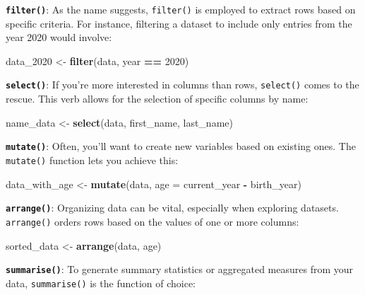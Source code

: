 \documentclass[
  b5paper]{book}
\newenvironment{Shaded}{\begin{snugshade}}{\end{snugshade}}
\newcommand{\AttributeTok}[1]{\textcolor[rgb]{0.13,0.29,0.53}{#1}}
\newcommand{\DecValTok}[1]{\textcolor[rgb]{0.00,0.00,0.81}{#1}}
\newcommand{\FunctionTok}[1]{\textcolor[rgb]{0.13,0.29,0.53}{\textbf{#1}}}
\newcommand{\NormalTok}[1]{#1}
\newcommand{\OtherTok}[1]{\textcolor[rgb]{0.56,0.35,0.01}{#1}}
\newcommand{\SpecialCharTok}[1]{\textcolor[rgb]{0.81,0.36,0.00}{\textbf{#1}}}
\begin{document}
\textbf{\texttt{filter()}}: As the name suggests, \texttt{filter()} is employed to extract rows based on specific criteria. For instance, filtering a dataset to include only entries from the year 2020 would involve:

\begin{Shaded}
\begin{Highlighting}[]
\NormalTok{data\_2020 }\OtherTok{\textless{}{-}} \FunctionTok{filter}\NormalTok{(data, year }\SpecialCharTok{==} \DecValTok{2020}\NormalTok{)}
\end{Highlighting}
\end{Shaded}

\textbf{\texttt{select()}}: If you're more interested in columns than rows, \texttt{select()} comes to the rescue. This verb allows for the selection of specific columns by name:

\begin{Shaded}
\begin{Highlighting}[]
\NormalTok{name\_data }\OtherTok{\textless{}{-}} \FunctionTok{select}\NormalTok{(data, first\_name, last\_name)}
\end{Highlighting}
\end{Shaded}

\textbf{\texttt{mutate()}}: Often, you'll want to create new variables based on existing ones. The \texttt{mutate()} function lets you achieve this:

\begin{Shaded}
\begin{Highlighting}[]
\NormalTok{data\_with\_age }\OtherTok{\textless{}{-}} \FunctionTok{mutate}\NormalTok{(data, }\AttributeTok{age =}\NormalTok{ current\_year }\SpecialCharTok{{-}}\NormalTok{ birth\_year)}
\end{Highlighting}
\end{Shaded}

\textbf{\texttt{arrange()}}: Organizing data can be vital, especially when exploring datasets. \texttt{arrange()} orders rows based on the values of one or more columns:

\begin{Shaded}
\begin{Highlighting}[]
\NormalTok{sorted\_data }\OtherTok{\textless{}{-}} \FunctionTok{arrange}\NormalTok{(data, age)}
\end{Highlighting}
\end{Shaded}

\textbf{\texttt{summarise()}}: To generate summary statistics or aggregated measures from your data, \texttt{summarise()} is the function of choice:
\end{document}
